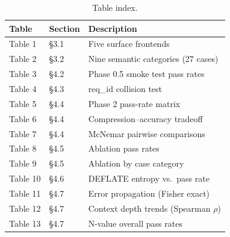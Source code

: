 \documentclass{article}
\begin{document}
\begin{table}[ht]
\centering
\small
\caption{Table index.}
\begin{tabular}{p{1.2cm}p{0.8cm}p{5cm}}
\toprule
Table & Section & Description \\
\midrule
Table 1 & \S3.1 & Five surface frontends \\
Table 2 & \S3.2 & Nine semantic categories (27 cases) \\
Table 3 & \S4.2 & Phase 0.5 smoke test pass rates \\
Table 4 & \S4.3 & req\_id collision test \\
Table 5 & \S4.4 & Phase 2 pass-rate matrix \\
Table 6 & \S4.4 & Compression--accuracy tradeoff \\
Table 7 & \S4.4 & McNemar pairwise comparisons \\
Table 8 & \S4.5 & Ablation pass rates \\
Table 9 & \S4.5 & Ablation by case category \\
Table 10 & \S4.6 & DEFLATE entropy vs.~pass rate \\
Table 11 & \S4.7 & Error propagation (Fisher exact) \\
Table 12 & \S4.7 & Context depth trends (Spearman $\rho$) \\
Table 13 & \S4.7 & N-value overall pass rates \\
\bottomrule
\end{tabular}
\end{table}



\clearpage
\small


\end{document}
